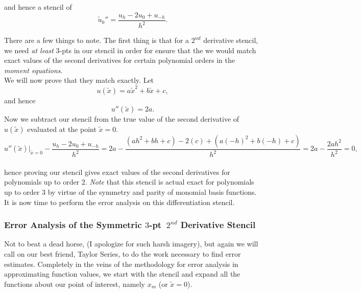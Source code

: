 \documentclass[paper=a4, fontsize=11pt]{scrartcl} %
\numberwithin{equation}{section} %
\numberwithin{figure}{section} %
\numberwithin{table}{section} %
\begin{document}
and hence a stencil of\\

$$\tilde{u}_0'' = \frac{ u_h - 2u_0 + u_{-h} }{h^2}.$$

There are a few things to note. The first thing is that for a $2^{nd}$ derivative stencil, we need \emph{at least} $3$-pts in our stencil in order for ensure that the we would match exact values of the second derivatives for certain polynomial orders in the \emph{moment equations}.\\

We will now prove that they match exactly. Let $$u(\tilde{x}) = a\tilde{x}^2 + b\tilde{x} + c,$$and hence $$u''(\tilde{x}) = 2a.$$ Now we subtract our stencil from the true value of the second derivative of $u(\tilde{x})$ evaluated at the point $\tilde{x}=0.$ \\

$$u''(\tilde{x})\Big|_{\tilde{x}=0} - \frac{ u_h - 2u_0 + u_{-h} }{h^2} = 2a - \frac{(ah^2+bh+c) - 2 (c) + (a(-h)^2 + b(-h) + c)}{h^2} = 2a - \frac{2ah^2}{h^2} = 0,$$\\

hence proving our stencil gives exact values of the second derivatives for polynomials up to order $2$. \emph{Note} that this stencil is actual exact for polynomials up to order $3$ by virtue of the symmetry and parity of monomial basis functions. It is now time to perform the error analysis on this differentiation stencil. \\

\subsubsection{Error Analysis of the Symmetric $3$-pt\ $2^{nd}$ Derivative Stencil}

$ $\\

Not to beat a dead horse, (I apologize for such harsh imagery), but again we will call on our best friend, Taylor Series, to do the work necessary to find error estimates. Completely in the veins of the methodology for error analysis in approximating function values, we start with the stencil and expand all the functions about our point of interest, namely $x_m$ (or $\tilde{x}=0$).\\
\end{document}
